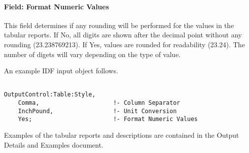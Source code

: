\paragraph{Field: Format Numeric Values}\label{field-format-numeric-values-tablestyle}

This field determines if any rounding will be performed for the values in the tabular reports. If No, all digits are shown after the decimal point without any rounding (23.238769213). If Yes, values are rounded for readability (23.24). The number of digets will vary depending on the type of value.

An example IDF input object follows.

\begin{lstlisting}

OutputControl:Table:Style,
    Comma,                     !- Column Separator
    InchPound,                 !- Unit Conversion
    Yes;                       !- Format Numeric Values
\end{lstlisting}

Examples of the tabular reports and descriptions are contained in the Output Details and Examples document.